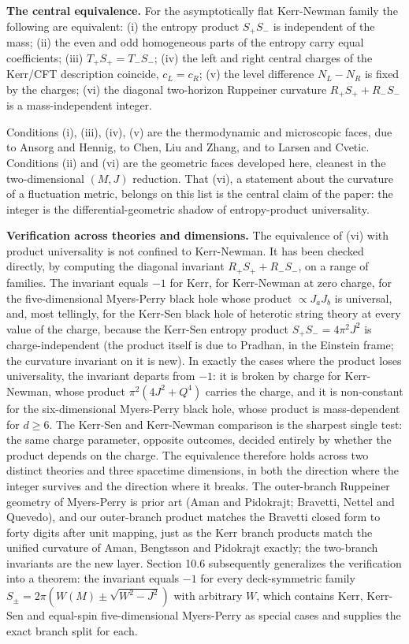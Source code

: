 \documentclass[11pt]{article}
\begin{document}
\textbf{The central equivalence.} For the asymptotically flat Kerr-Newman family the following are equivalent:
(i) the entropy product $S_+S_-$ is independent of the mass;
(ii) the even and odd homogeneous parts of the entropy carry equal coefficients;
(iii) $T_+S_+ = T_-S_-$;
(iv) the left and right central charges of the Kerr/CFT description coincide, $c_L = c_R$;
(v) the level difference $N_L - N_R$ is fixed by the charges;
(vi) the diagonal two-horizon Ruppeiner curvature $R_+S_+ + R_-S_-$ is a mass-independent integer.

Conditions (i), (iii), (iv), (v) are the thermodynamic and microscopic faces, due to Ansorg and Hennig, to Chen, Liu and Zhang, and to Larsen and Cvetic. Conditions (ii) and (vi) are the geometric faces developed here, cleanest in the two-dimensional $(M,J)$ reduction. That (vi), a statement about the curvature of a fluctuation metric, belongs on this list is the central claim of the paper: the integer is the differential-geometric shadow of entropy-product universality.

\textbf{Verification across theories and dimensions.} The equivalence of (vi) with product universality is not confined to Kerr-Newman. It has been checked directly, by computing the diagonal invariant $R_+S_+ + R_-S_-$, on a range of families. The invariant equals $-1$ for Kerr, for Kerr-Newman at zero charge, for the five-dimensional Myers-Perry black hole whose product $\propto J_aJ_b$ is universal, and, most tellingly, for the Kerr-Sen black hole of heterotic string theory at every value of the charge, because the Kerr-Sen entropy product $S_+S_- = 4\pi^2 J^2$ is charge-independent (the product itself is due to Pradhan, in the Einstein frame; the curvature invariant on it is new). In exactly the cases where the product loses universality, the invariant departs from $-1$: it is broken by charge for Kerr-Newman, whose product $\pi^2(4J^2+Q^4)$ carries the charge, and it is non-constant for the six-dimensional Myers-Perry black hole, whose product is mass-dependent for $d \geq 6$. The Kerr-Sen and Kerr-Newman comparison is the sharpest single test: the same charge parameter, opposite outcomes, decided entirely by whether the product depends on the charge. The equivalence therefore holds across two distinct theories and three spacetime dimensions, in both the direction where the integer survives and the direction where it breaks. The outer-branch Ruppeiner geometry of Myers-Perry is prior art (Aman and Pidokrajt; Bravetti, Nettel and Quevedo), and our outer-branch product matches the Bravetti closed form to forty digits after unit mapping, just as the Kerr branch products match the unified curvature of Aman, Bengtsson and Pidokrajt exactly; the two-branch invariants are the new layer. Section 10.6 subsequently generalizes the verification into a theorem: the invariant equals $-1$ for every deck-symmetric family $S_\pm = 2\pi(W(M) \pm \sqrt{W^2 - J^2})$ with arbitrary $W$, which contains Kerr, Kerr-Sen and equal-spin five-dimensional Myers-Perry as special cases and supplies the exact branch split for each.
\end{document}

